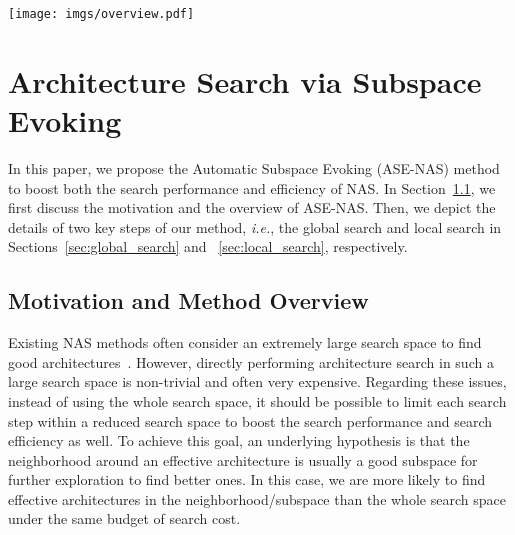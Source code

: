 \documentclass[lettersize,journal]{IEEEtran}
\newcommand{\sexyname}{ASE-NAS\xspace}
\def\ie{\emph{i.e.}} \def\Ie{\emph{I.e.}}
\begin{document}
\begin{figure*}[t]
\centering
\texttt{[image: imgs/overview.pdf]}
\caption{An overview of our \sexyname. We build a set of subspaces  centered on randomly sampled candidate architectures  and construct a subspace graph  to model the relationships among these subspaces.
By taking  as the input, the controller first evokes a promising subspace  via global search policy and then predicts an architecture modification  via local search policy.
Next, we update the candidate architecture  with the resultant architecture  if  has better performance than  (\ie, ).
}
\label{fig:overview}
\end{figure*}

\section{Architecture Search via Subspace Evoking}

In this paper, we propose the Automatic Subspace Evoking (\sexyname) method to boost both the search performance and efficiency of NAS.
In Section~\ref{sec:overall}, we first discuss the motivation and the overview of \sexyname.
Then, we depict the details of two key steps of our method, \ie, the global search and local search in Sections~\ref{sec:global_search} and ~\ref{sec:local_search}, respectively.


\subsection{Motivation and Method Overview}
\label{sec:overall}
Existing NAS methods often consider an extremely large search space  to find good architectures~\cite{pham2018efficient,liu2018darts, Cai2020Once}. 
However, directly performing architecture search in such a large search space is non-trivial and often very expensive.
Regarding these issues, instead of using the whole search space, it should be possible to limit each search step within a reduced search space to boost the search performance and search efficiency as well.
To achieve this goal, an underlying hypothesis is that the neighborhood around an effective architecture is usually a good subspace for further exploration to find better ones.
In this case, we are more likely to find effective architectures in the neighborhood/subspace than the whole search space under the same budget of search cost.
 
\end{document}

